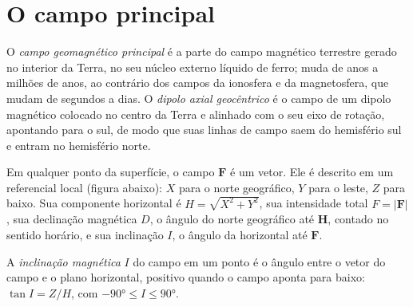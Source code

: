 \section{O campo principal}

\begin{definition}\label{def:b3:palaeomagnetism:main-field}
O \emph{campo geomagnético principal} é a parte do
campo magnético terrestre gerado no interior da Terra, no seu núcleo externo
líquido de ferro; muda de anos a milhões de anos, ao contrário dos campos da
ionosfera e da magnetosfera, que mudam de segundos a dias. O
\emph{dipolo axial geocêntrico} é o campo de um
dipolo magnético colocado no centro da Terra e alinhado com o seu eixo
de rotação, apontando para o sul, de modo que suas linhas de campo saem do hemisfério sul e
entram no hemisfério norte.
\end{definition}

Em qualquer ponto da superfície, o campo $\mathbf F$ é um vetor. Ele é descrito
em um referencial local (figura abaixo): $X$ para o norte geográfico, $Y$ para o
leste, $Z$ para baixo. Sua componente horizontal é $H = \sqrt{X^2 + Y^2}$, sua
intensidade total $F = |\mathbf F|$, sua declinação magnética $D$, o ângulo do
norte geográfico até $\mathbf H$, contado no sentido horário, e sua inclinação $I$, o
ângulo da horizontal até $\mathbf F$.

\begin{definition}\label{def:b3:palaeomagnetism:inclination}
A \emph{inclinação magnética} $I$ do campo em
um ponto é o ângulo entre o vetor do campo e o plano horizontal,
positivo quando o campo aponta para baixo: $\tan I = Z/H$, com $-\ang{90} \le I
\le \ang{90}$.
\end{definition}

